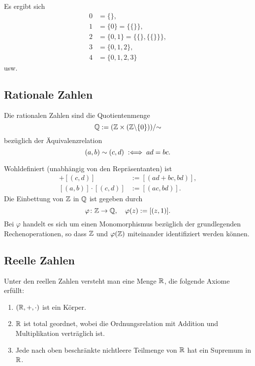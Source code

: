 Es ergibt sich
\begin{align*}
0 &= \{\},\\
1 &= \{0\} = \{\{\}\},\\
2 &= \{0,1\} = \{\{\},\{\{\}\}\},\\
3 &= \{0,1,2\},\\
4 &= \{0,1,2,3\}
\end{align*}
usw.

\newpage
\subsection{Rationale Zahlen}
\begin{definition}
Die rationalen Zahlen sind die Quotientenmenge
\begin{equation}
\mathbb Q := (\mathbb Z\times(\mathbb Z{\setminus}\{0\}))/{\sim}
\end{equation}
bezüglich der Äquivalenzrelation
\begin{equation}
(a,b)\sim (c,d) \;:\Longleftrightarrow\; ad=bc.
\end{equation}
\end{definition}
Wohldefiniert (unabhängig von den Repräsentanten) ist
\begin{align}
[(a,b)]+[(c,d)] &:= [(ad+bc, bd)],\\
[(a,b)]\cdot [(c,d)] &:= [(ac,bd)].
\end{align}
Die Einbettung von $\mathbb Z$ in $\mathbb Q$ ist gegeben durch
\begin{equation}
\varphi\colon \mathbb Z\to\mathbb Q,\quad \varphi(z):=[(z,1)].
\end{equation}
Bei $\varphi$ handelt es sich um einen Monomorphismus
bezüglich der grundlegenden Rechenoperationen, so
dass $\mathbb Z$ und $\varphi(\mathbb Z)$ miteinander
identifiziert werden können.

\subsection{Reelle Zahlen}
\begin{definition}
Unter den reellen Zahlen versteht man eine Menge $\mathbb R$, die folgende
Axiome erfüllt:
\begin{enumerate}[itemsep=0pt]
\item $(\mathbb R,+,\cdot)$ ist ein Körper.
\item $\mathbb R$ ist total geordnet, wobei die Ordnungsrelation mit
Addition und Multiplikation verträglich ist.
\item Jede nach oben beschränkte nichtleere Teilmenge von $\mathbb R$ hat
  ein Supremum in $\mathbb R$.
\end{enumerate}
\end{definition}

